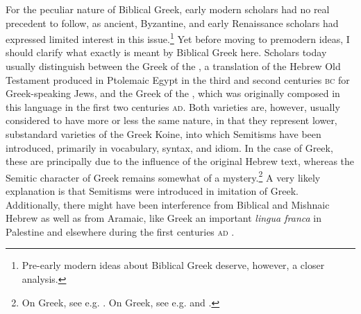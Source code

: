 For the peculiar nature of Biblical Greek, early modern scholars had no real precedent to follow, as ancient, Byzantine, and early Renaissance scholars had expressed limited interest in this issue.\footnote{Pre-early modern ideas about Biblical Greek deserve, however, a closer analysis.} Yet before moving to premodern ideas, I should clarify what exactly is meant by Biblical Greek here. Scholars today usually distinguish between the Greek of the , a translation of the Hebrew Old Testament produced in Ptolemaic Egypt in the third and second centuries \textsc{bc} for Greek-speaking Jews, and the Greek of the , which was originally composed in this language in the first two centuries \textsc{ad}. Both varieties are, however, usually considered to have more or less the same nature, in that they represent lower, substandard varieties of the Greek Koine, into which Semitisms have been introduced, primarily in vocabulary, syntax, and idiom. In the case of  Greek, these are principally due to the influence of the original Hebrew text, whereas the Semitic character of  Greek remains somewhat of a mystery.\footnote{On  Greek, see e.g. \citet[106--108]{Horrocks2010}. On  Greek, see e.g. \citet{Janse2007} and \citet{Porter2013}.} A very likely explanation is that Semitisms were introduced in imitation of  Greek. Additionally, there might have been interference from Biblical and Mishnaic Hebrew as well as from Aramaic, like Greek an important \textit{lingua franca} in Palestine and elsewhere during the first centuries \textsc{ad} \citep{Janse2007}.


